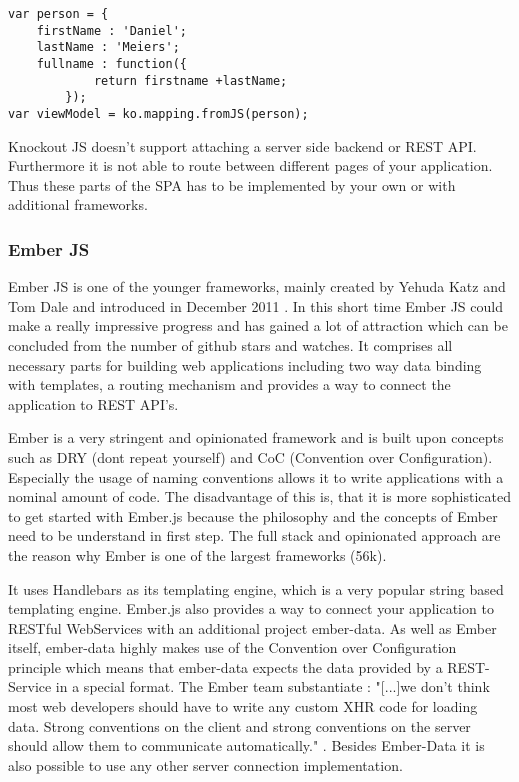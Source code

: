 \begin{lstlisting}[label=ko_mapping,caption=the mapping plugin]
var person = {
	firstName : 'Daniel';
	lastName : 'Meiers';
	fullname : function({
			return firstname +lastName;
		});
var viewModel = ko.mapping.fromJS(person);
\end{lstlisting}

Knockout JS doesn't support attaching a server side backend or REST API.
Furthermore it is not able to route between different pages of your application.
Thus these parts of the SPA  has to be implemented by your own or with additional frameworks.

\subsubsection{Ember JS}

Ember JS is one of the younger frameworks, mainly created by Yehuda Katz and Tom Dale and introduced in December 2011 \autocite{tech-ana:announcing-ember}.
In this short time Ember JS could make a really impressive progress and has gained a lot of attraction which can be concluded from the number of github stars and watches. 
It comprises all necessary parts for building web applications including two way data binding with templates, a routing mechanism and provides a way to connect the application to REST API's.

Ember  is a very stringent and opinionated framework and is built upon concepts such as DRY (dont  repeat yourself) and CoC (Convention over Configuration).
Especially the usage of naming conventions allows it to write applications with a nominal amount of code.
The disadvantage of this is, that it is more sophisticated to get started with Ember.js because the philosophy and the concepts of Ember need to be understand in first step.
The full stack and opinionated approach are the reason why Ember is one of the largest frameworks (56k).

It uses Handlebars as its templating engine, which is a very popular string based templating engine.
Ember.js also provides a way to connect your application to RESTful WebServices with an additional project ember-data.
As well as Ember itself, ember-data highly makes use of the Convention over Configuration principle which means that ember-data expects the data provided by a REST-Service in a special format.
The Ember team substantiate : "[...]we don't think most web developers should have to write any custom XHR code for loading data.
Strong conventions on the client and strong conventions on the server should allow them to communicate automatically." \autocite{tech-ana:ember-data}.
Besides Ember-Data it is also possible to use any other server connection implementation.

